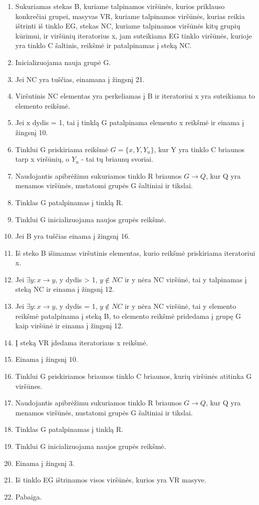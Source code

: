 \begin{enumerate}
	\item Sukuriamas stekas B, kuriame talpinamos viršūnės, kurios priklauso konkrečiai grupei, masyvas VR, kuriame talpinamos viršūnės, kurias reikia ištrinti iš tinklo EG, stekas NC, kuriame talpinamos viršūnės kitų grupių kūrimui, ir viršūnių iteratorius x, jam suteikiama EG tinklo viršūnės, kurioje yra tinklo C šaltinis, reikšmė ir patalpinamas į steką NC.
	\item Inicializuojama nauja grupė G.
	\item Jei NC yra tuščias, einamana į žingsnį 21.
	\item Viršutinis NC elementas yra perkeliamas į B ir iteratoriui x yra suteikiama to elemento reikšmė.
	\item Jei x dydis = 1, tai į tinklą G patalpinama elemento x reikšmė ir einama į žingsnį 10.
	\item Tinklui G priskiriama reikšmė $G=\{x, Y, Y_u\}$, kur Y yra tinklo C briaunos tarp x viršūnių, o $Y_u$ - tai tų briaunų svoriai. 
	\item Naudojantis apibrėžimu sukuriamos tinklo R briaunos $G \rightarrow Q$, kur Q yra menamos viršūnės, nustatomi grupės G šaltiniai ir tikslai.
	\item Tinklas G patalpinamas į tinklą R.
	\item Tinklui G inicializuojama naujos grupės reikšmė.
	\item Jei B yra tuščias einama į žingsnį 16.
	\item Iš steko B išimamas viršutinis elementas, kurio reikšmė priskiriama iteratoriui x.
	\item Jei $\exists y : x \rightarrow y$, y dydis > 1, $y \notin NC$ ir y nėra NC viršūnė, tai y talpinamas į steką NC ir einama į žingsnį 12.
	\item Jei $\exists y : x \rightarrow y$, y dydis = 1, $y \notin NC$ ir y nėra NC viršūnė, tai y elemento reikšmė patalpinama į steką B, to elemento reikšmė pridedama į grupę G kaip viršūnė ir einama į žingsnį 12.
	\item Į steką VR įdedama iteratoriaus x reikšmė.
	\item Einama į žingsnį 10.
	\item Tinklui G priskiriamos briaunos tinklo C briaunos, kurių viršūnės atitinka G viršūnes. 
	\item Naudojantis apibrėžimu sukuriamos tinklo R briaunos $G \rightarrow Q$, kur Q yra menamos viršūnės, nustatomi grupės G šaltiniai ir tikslai.
	\item Tinklas G patalpinamas į tinklą R.
	\item Tinklui G inicializuojama naujos grupės reikšmė.
	\item  Einama į žingsnį 3.
	\item  Iš tinklo EG ištrinamos visos viršūnės, kurios yra VR masyve.
	\item  Pabaiga.
\end{enumerate}


